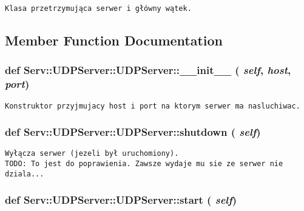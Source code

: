 \footnotesize\begin{verbatim}Klasa przetrzymująca serwer i główny wątek.\end{verbatim}
\normalsize
 

\subsection{Member Function Documentation}
\hypertarget{class_serv_1_1_u_d_p_server_1_1_u_d_p_server_08fcc38fca5727c085acc11c9df7f512}{
\subsubsection[{\_\-\_\-init\_\-\_\-}]{\setlength{\rightskip}{0pt plus 5cm}def Serv::UDPServer::UDPServer::\_\-\_\-init\_\-\_\- ( {\em self}, \/   {\em host}, \/   {\em port})}}
\label{class_serv_1_1_u_d_p_server_1_1_u_d_p_server_08fcc38fca5727c085acc11c9df7f512}




\footnotesize\begin{verbatim}Konstruktor przyjmujacy host i port na ktorym serwer ma nasluchiwac.\end{verbatim}
\normalsize
 \hypertarget{class_serv_1_1_u_d_p_server_1_1_u_d_p_server_43b3b2016322a79953939e56653d226d}{
\subsubsection[{shutdown}]{\setlength{\rightskip}{0pt plus 5cm}def Serv::UDPServer::UDPServer::shutdown ( {\em self})}}
\label{class_serv_1_1_u_d_p_server_1_1_u_d_p_server_43b3b2016322a79953939e56653d226d}




\footnotesize\begin{verbatim}Wyłącza serwer (jezeli był uruchomiony).
TODO: To jest do poprawienia. Zawsze wydaje mu sie ze serwer nie dziala...
\end{verbatim}
\normalsize
 \hypertarget{class_serv_1_1_u_d_p_server_1_1_u_d_p_server_9feda8e8dfee13803aa3fd07ddd003a1}{
\subsubsection[{start}]{\setlength{\rightskip}{0pt plus 5cm}def Serv::UDPServer::UDPServer::start ( {\em self})}}
\label{class_serv_1_1_u_d_p_server_1_1_u_d_p_server_9feda8e8dfee13803aa3fd07ddd003a1}




